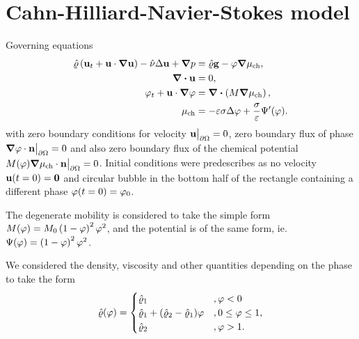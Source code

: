 \section*{Cahn-Hilliard-Navier-Stokes model}

Governing equations
\begin{align*}
    \hat{\varrho} \left(\mathbf{u}_t + \mathbf{u} \cdot \grad{\mathbf{u}}\right) - \hat{\nu} \Delta{\mathbf{u}} + \grad{p} &= \hat{\varrho} \mathbf{g} - \varphi \grad{\mu_{\text{ch}}}, \\
    \div{\mathbf{u}} &= 0, \\
    \varphi_t + \mathbf{u} \cdot \grad{\varphi} &= \div{\left(M\grad{\mu_{\text{ch}}}\right)}, \\
    \mu_{\text{ch}} &= -\varepsilon \sigma \Delta \varphi + \frac{\sigma}{\varepsilon} \Psi'(\varphi).
\end{align*}
with zero boundary conditions for velocity $\mathbf{u}\big|_{\partial \Omega} = 0$, zero boundary flux of phase $\grad{\varphi} \cdot \mathbf{n} \big|_{\partial \Omega}= 0$ and also zero boundary flux of the chemical potential $M(\varphi) \grad{\mu_{\text{ch}}} \cdot \mathbf{n} \big|_{\partial \Omega} = 0$. Initial conditions were predescribes as no velocity $\mathbf{u}(t = 0) = \mathbf{0}$ and circular bubble in the bottom half of the rectangle containing a different phase $\varphi(t = 0) = \varphi_0$.

The degenerate mobility is considered to take the simple form $M(\varphi) = M_0 \left(1 - \varphi\right)^2 \varphi^2$, and the potential is of the same form, ie. $\Psi(\varphi) = \left(1 - \varphi\right)^2 \varphi^2$.

We considered the density, viscosity and other quantities depending on the phase to take the form
\begin{equation*}
    \hat{\varrho}(\varphi) = \begin{cases} 
        \hat{\varrho}_1 &, \varphi < 0 \\
        \hat{\varrho}_1 + (\hat{\varrho}_2 - \hat{\varrho}_1) \varphi &, 0 \leq \varphi \leq 1, \\
        \hat{\varrho}_2 &, \varphi > 1.
                \end{cases}
\end{equation*}

